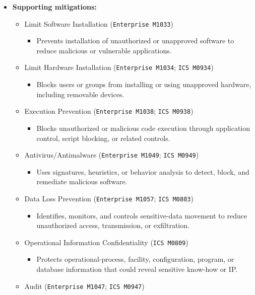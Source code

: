 \documentclass[10pt,a4paper,oneside]{report}
\begin{document}
\begin{itemize}
\item \textbf{Supporting mitigations:}
\begin{itemize}
\item Limit Software Installation (\texttt{Enterprise M1033})
\begin{itemize}
\item Prevents installation of unauthorized or unapproved software to reduce malicious or vulnerable applications.
\end{itemize}
\item Limit Hardware Installation (\texttt{Enterprise M1034}; \texttt{ICS M0934})
\begin{itemize}
\item Blocks users or groups from installing or using unapproved hardware, including removable devices.
\end{itemize}
\item Execution Prevention (\texttt{Enterprise M1038}; \texttt{ICS M0938})
\begin{itemize}
\item Blocks unauthorized or malicious code execution through application control, script blocking, or related controls.
\end{itemize}
\item Antivirus/Antimalware (\texttt{Enterprise M1049}; \texttt{ICS M0949})
\begin{itemize}
\item Uses signatures, heuristics, or behavior analysis to detect, block, and remediate malicious software.
\end{itemize}
\item Data Loss Prevention (\texttt{Enterprise M1057}; \texttt{ICS M0803})
\begin{itemize}
\item Identifies, monitors, and controls sensitive-data movement to reduce unauthorized access, transmission, or exfiltration.
\end{itemize}
\item Operational Information Confidentiality (\texttt{ICS M0809})
\begin{itemize}
\item Protects operational-process, facility, configuration, program, or database information that could reveal sensitive know-how or IP.
\end{itemize}
\item Audit (\texttt{Enterprise M1047}; \texttt{ICS M0947})
\begin{itemize}

\end{itemize}
\end{itemize}
\end{itemize}
\end{document}
